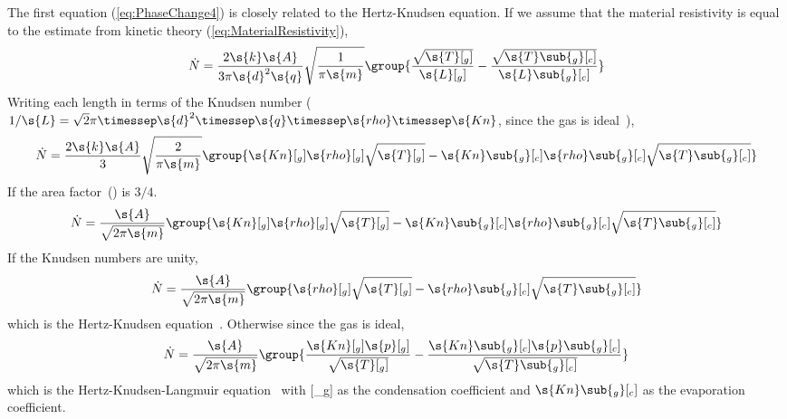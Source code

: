 The first equation (\ref{eq:PhaseChange4}) is closely related to the Hertz-Knudsen equation.  If we assume that the material resistivity is equal to the estimate from kinetic theory (\autoref{eq:MaterialResistivity}),
\begin{equation}
  \dot{N} = \frac{2\s{k}\s{A}}{3\pi\s{d}^2\s{q}}\sqrt{\frac{1}{\pi\s{m}}}\group{\frac{\sqrt{\s{T}[_g]}}{\s{L}[_g]} - \frac{\sqrt{\s{T}\sub{_g}[_c]}}{\s{L}\sub{_g}[_c]}}
\end{equation}
Writing each length in terms of the Knudsen number ($1/\s{L} = \sqrt{2}\pi\timessep\s{d}^2\timessep\s{q}\timessep\s{rho}\timessep\s{Kn}$, since the gas is ideal~\cite{Cussler1997}),
\begin{equation}
  \dot{N} = \frac{2\s{k}\s{A}}{3}\sqrt{\frac{2}{\pi\s{m}}}\group{\s{Kn}[_g]\s{rho}[_g]\sqrt{\s{T}[_g]} - \s{Kn}\sub{_g}[_c]\s{rho}\sub{_g}[_c]\sqrt{\s{T}\sub{_g}[_c]}}
\end{equation}
If the area factor~() is $3/4$. %
\begin{equation}
  \dot{N} = \frac{\s{A}}{\sqrt{2\pi\s{m}}}\group{\s{Kn}[_g]\s{rho}[_g]\sqrt{\s{T}[_g]} - \s{Kn}\sub{_g}[_c]\s{rho}\sub{_g}[_c]\sqrt{\s{T}\sub{_g}[_c]}}
\end{equation}
If the Knudsen numbers are unity,
\begin{equation}
  \label{eq:HK}
  \dot{N} = \frac{\s{A}}{\sqrt{2\pi\s{m}}}\group{\s{rho}[_g]\sqrt{\s{T}[_g]} - \s{rho}\sub{_g}[_c]\sqrt{\s{T}\sub{_g}[_c]}}
\end{equation}
which is the Hertz-Knudsen equation~\cite{Ytrehus1997}.  Otherwise since the gas is ideal,
\begin{equation}
  \dot{N} = \frac{\s{A}}{\sqrt{2\pi\s{m}}}\group{\frac{\s{Kn}[_g]\s{p}[_g]}{\sqrt{\s{T}[_g]}} - \frac{\s{Kn}\sub{_g}[_c]\s{p}\sub{_g}[_c]}{\sqrt{\s{T}\sub{_g}[_c]}}}
\end{equation}
which is the Hertz-Knudsen-Langmuir equation~\cite{Frohn2000} with [_g] as the condensation coefficient and $\s{Kn}\sub{_g}[_c]$ as the evaporation coefficient.




